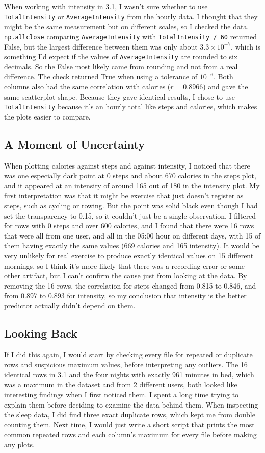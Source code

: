 \documentclass[11pt]{article}
\begin{document}
When working with intensity in 3.1, I wasn't sure whether to use \texttt{TotalIntensity} or \texttt{AverageIntensity} from the hourly data.
I thought that they might be the same measurement but on different scales, so I checked the data.
\texttt{np.allclose} comparing \texttt{AverageIntensity} with \texttt{TotalIntensity / 60} returned False, but the largest difference between them was only about $3.3 \times 10^{-7}$, which is something I'd expect if the values of \texttt{AverageIntensity} are rounded to six decimals.
So the False most likely came from rounding and not from a real difference.
The check returned True when using a tolerance of $10^{-6}$.
Both columns also had the same correlation with calories ($r = 0.8966$) and gave the same scatterplot shape.
Because they gave identical results, I chose to use \texttt{TotalIntensity} because it's an hourly total like steps and calories, which makes the plots easier to compare.

\subsection{A Moment of Uncertainty}

When plotting calories against steps and against intensity, I noticed that there was one especially dark point at 0 steps and about 670 calories in the steps plot, and it appeared at an intensity of around 165 out of 180 in the intensity plot.
My first interpretation was that it might be exercise that just doesn't register as steps, such as cycling or rowing.
But the point was solid black even though I had set the transparency to 0.15, so it couldn't just be a single observation.
I filtered for rows with 0 steps and over 600 calories, and I found that there were 16 rows that were all from one user, and all in the 05:00 hour on different days, with 15 of them having exactly the same values (669 calories and 165 intensity).
It would be very unlikely for real exercise to produce exactly identical values on 15 different mornings, so I think it's more likely that there was a recording error or some other artifact, but I can't confirm the cause just from looking at the data.
By removing the 16 rows, the correlation for steps changed from 0.815 to 0.846, and from 0.897 to 0.893 for intensity, so my conclusion that intensity is the better predictor actually didn't depend on them.

\subsection{Looking Back}

If I did this again, I would start by checking every file for repeated or duplicate rows and suspicious maximum values, before interpreting any outliers.
The 16 identical rows in 3.1 and the four nights with exactly 961 minutes in bed, which was a maximum in the dataset and from 2 different users, both looked like interesting findings when I first noticed them.
I spent a long time trying to explain them before deciding to examine the data behind them.
When inspecting the sleep data, I did find three exact duplicate rows, which kept me from double counting them.
Next time, I would just write a short script that prints the most common repeated rows and each column's maximum for every file before making any plots.
\end{document}
